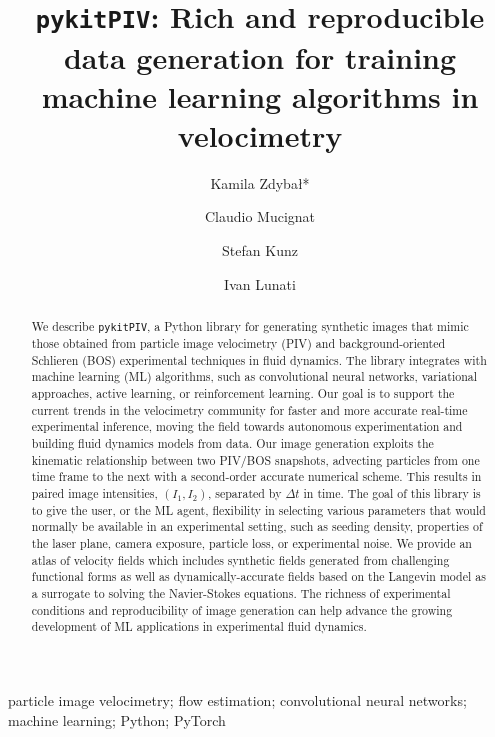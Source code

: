 \documentclass[a4paper,fleqn]{cas-dc}
\begin{document}


\title [mode = title]{\texttt{pykitPIV}: Rich and reproducible data generation for training machine learning algorithms in velocimetry}

\author[EMPA]{Kamila Zdyba\l{}*}

\author[EMPA]{Claudio Mucignat}
\author[EMPA]{Stefan Kunz}
\author[EMPA]{Ivan Lunati}

\address[EMPA]{Laboratory for Computational Engineering, Swiss Federal Laboratories for Materials Science and Technology, Empa, Dübendorf, Switzerland}

\begin{abstract}
We describe \texttt{pykitPIV}, a Python library for generating synthetic images that mimic those obtained from particle image velocimetry (PIV) and background-oriented Schlieren (BOS) experimental techniques in fluid dynamics. The library integrates with machine learning (ML) algorithms, such as convolutional neural networks, variational approaches, active learning, or reinforcement learning. Our goal is to support the current trends in the velocimetry community for faster and more accurate real-time experimental inference, moving the field towards autonomous experimentation and building fluid dynamics models from data. Our image generation exploits the kinematic relationship between two PIV/BOS snapshots, advecting particles from one time frame to the next with a second-order accurate numerical scheme. This results in paired image intensities, $(I_1, I_2)$, separated by $\Delta t$ in time. The goal of this library is to give the user, or the ML agent, flexibility in selecting various parameters that would normally be available in an experimental setting, such as seeding density, properties of the laser plane, camera exposure, particle loss, or experimental noise. 
We provide an atlas of velocity fields which includes synthetic fields generated from challenging functional forms as well as dynamically-accurate fields based on the Langevin model as a surrogate to solving the Navier-Stokes equations. The richness of experimental conditions and reproducibility of image generation can help advance the growing development of ML applications in experimental fluid dynamics.
\end{abstract}

\begin{keywords}
particle image velocimetry; flow estimation; convolutional neural networks; machine learning; Python; PyTorch
\end{keywords}
\end{document}
